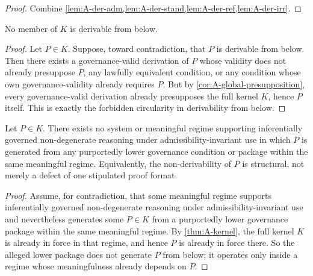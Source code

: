 \begin{proof}
Combine \cref{lem:A-der-adm,lem:A-der-stand,lem:A-der-ref,lem:A-der-irr}.
\end{proof}

\begin{theorem}
\label{thm:A-kernel-nonderivable}
No member of $K$ is derivable from below.
\end{theorem}

\begin{proof}
Let $P\in K$. Suppose, toward contradiction, that $P$ is derivable from below. Then there exists a governance-valid derivation of $P$ whose validity does not already presuppose $P$, any lawfully equivalent condition, or any condition whose own governance-validity already requires $P$. But by \cref{cor:A-global-presupposition}, every governance-valid derivation already presupposes the full kernel $K$, hence $P$ itself. This is exactly the forbidden circularity in derivability from below.
\end{proof}

\begin{theorem}
\label{thm:A-structural-nonderivability}
Let $P\in K$. There exists no system or meaningful regime supporting inferentially governed non-degenerate reasoning under admissibility-invariant use in which $P$ is generated from any purportedly lower governance condition or package within the same meaningful regime. Equivalently, the non-derivability of $P$ is structural, not merely a defect of one stipulated proof format.
\end{theorem}

\begin{proof}
Assume, for contradiction, that some meaningful regime supports inferentially governed non-degenerate reasoning under admissibility-invariant use and nevertheless generates some $P\in K$ from a purportedly lower governance package within the same meaningful regime. By \cref{thm:A-kernel}, the full kernel $K$ is already in force in that regime, and hence $P$ is already in force there. So the alleged lower package does not generate $P$ from below; it operates only inside a regime whose meaningfulness already depends on $P$.
\end{proof}

